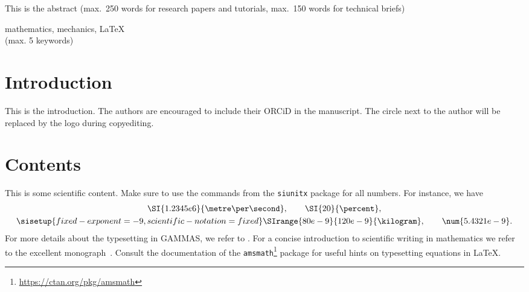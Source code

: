 \documentclass[usebibtex]{gammas}
\theoremstyle{definition}
\begin{document}
\maketitle
%

\begin{gammabstract}
	This is the abstract (max.\ 250 words for research papers and tutorials, max.\ 150 words for technical briefs)
\end{gammabstract}

\begin{gammkeywords}
	mathematics, mechanics, \LaTeX \\ (max. 5 keywords)
\end{gammkeywords}

\section{Introduction}
This is the introduction. The authors are encouraged to include their \textsf{ORCiD} in the manuscript. The circle next to the author will be replaced by the logo during copyediting.

\section{Contents}
This is some scientific content. Make sure to use the commands from the \texttt{siunitx} package for all numbers. For instance, we have
\begin{gather*}
	\SI{1.2345e6}{\metre\per\second}, \qquad \SI{20}{\percent},\\
	{\sisetup{fixed-exponent=-9,scientific-notation=fixed}\SIrange{80e-9}{120e-9}{\kilogram}}, \qquad \num{5.4321e-9}.
\end{gather*}
For more details about the typesetting in GAMMAS, we refer to \cite{kern2019gammas}. For a concise introduction to scientific writing
in mathematics we refer to the excellent monograph~\cite{higham2020handbook}. Consult the documentation of the \texttt{amsmath}\footnote{\url{https://ctan.org/pkg/amsmath}} package for useful hints on typesetting equations in \LaTeX{}.
\end{document}

